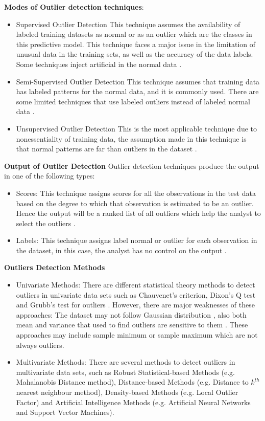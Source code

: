 \textbf{Modes of Outlier detection techniques}:
\begin{itemize}
\item{Supervised Outlier Detection}
This technique assumes the availability of labeled training datasets as normal or as an outlier which are the classes in this predictive model. This technique faces a major issue in the limitation of unusual data in the training sets, as well as the accuracy of the data labels. Some techniques inject artificial in the normal data \citep{Kurukshetra}. 
\item{Semi-Supervised Outlier Detection}
This technique assumes that training data has labeled patterns for the normal data, and it is commonly used. There are some limited techniques that use labeled outliers instead of labeled normal data \citep{Kurukshetra}.
\item{Unsupervised Outlier Detection}
This is the most applicable technique due to nonessentiality of training data, the assumption made in this technique is that normal patterns are far than outliers in the dataset \citep{Kurukshetra}.
\end{itemize}

\textbf{Output of Outlier Detection}
Outlier detection techniques produce the output in one of the following types:
\begin{itemize}
\item{Scores:}
This technique assigns scores for all the observations in the test data based on the degree to which that observation is estimated to be an outlier. Hence the output will be a ranked list of all outliers which help the analyst to select the outliers \citep{Kurukshetra}.
\item{Labels:}
This technique assigns label normal or outlier for each observation in the dataset, in this case, the analyst has no control on the output \citep{Kurukshetra}.
\end{itemize}

\textbf{Outliers Detection Methods}
\begin{itemize}
\item{Univariate Methods:}
There are different statistical theory methods to detect outliers in univariate data sets such as Chauvenet's criterion, Dixon's Q test and Grubb's test for outliers
. However, there are major weaknesses of these approaches: The dataset may not follow Gaussian distribution
, also both mean and variance that used to find outliers are sensitive to them \citep{Songwon}. These approaches may include sample minimum or sample maximum which are not always outliers.
\item{Multivariate Methods:}
There are several methods to detect outliers in multivariate data sets, such as Robust Statistical-based Methods (e.g. Mahalanobis Distance method), Distance-based Methods (e.g. Distance to $k^{th}$ nearest neighbour method), Density-based Methods (e.g. Local Outlier Factor) and Artificial Intelligence Methods (e.g. Artificial Neural Networks and Support Vector Machines).
\end{itemize}

